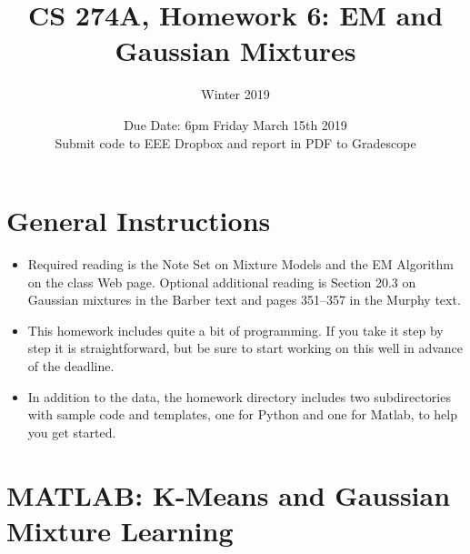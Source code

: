 \documentclass[11pt]{article}
\begin{document}
\setlength{\parskip}{1.2ex plus0.3ex minus 0.3ex}

 


\thispagestyle{empty} \pagestyle{myheadings} 


\title{CS 274A, Homework 6: EM and Gaussian Mixtures}
 
\author{Winter 2019}
\date{Due Date:  6pm Friday March 15th 2019 \\
Submit code to EEE Dropbox and report in PDF to Gradescope}
 

\maketitle

\section*{General Instructions}
\begin{itemize}

\item Required reading is the Note Set  on Mixture Models and the EM Algorithm on the class Web page.
Optional additional reading is    Section 20.3 on Gaussian mixtures in the Barber text and
 pages 351--357 in the Murphy text.
 
\item This  homework includes quite a bit of programming. If you take it
step by step it is straightforward, but be sure to start working on this well
in advance of the deadline. 

\item In addition to the data, the homework directory includes two subdirectories with
sample code and templates, one for Python and one for Matlab, to help you get started.
     
\end{itemize}
 




\section*{MATLAB: K-Means and Gaussian Mixture Learning}
\end{document}
